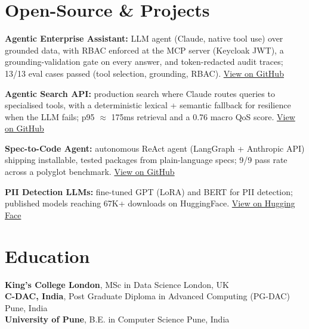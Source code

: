 \documentclass[10pt,a4paper]{article}
\begin{document}
\section{Open-Source \& Projects}
\begin{tight}
  \item \textbf{Agentic Enterprise Assistant:} LLM agent (Claude, native tool use) over grounded data, with RBAC enforced at the MCP server (Keycloak JWT), a grounding-validation gate on every answer, and token-redacted audit traces; 13/13 eval cases passed (tool selection, grounding, RBAC). \href{https://github.com/abhijeetscode/Agentic-Enterprise-Assistant}{View on GitHub}
  \item \textbf{Agentic Search API:} production search where Claude routes queries to specialised tools, with a deterministic lexical + semantic fallback for resilience when the LLM fails; p95 $\approx$ 175ms retrieval and a 0.76 macro QoS score. \href{https://github.com/abhijeetscode/search-agent}{View on GitHub}
  \item \textbf{Spec-to-Code Agent:} autonomous ReAct agent (LangGraph + Anthropic API) shipping installable, tested packages from plain-language specs; 9/9 pass rate across a polyglot benchmark. \href{https://github.com/abhijeetscode/Spec-to-Code-Agent}{View on GitHub}
  \item \textbf{PII Detection LLMs:} fine-tuned GPT (LoRA) and BERT for PII detection; published models reaching 67K+ downloads on HuggingFace. \href{https://huggingface.co/ab-ai/pii_model}{View on Hugging Face}
\end{tight}

\section{Education}
{\color{company}\bfseries King's College London}, MSc in Data Science \hfill {\color{muted}London, UK}\\
{\color{company}\bfseries C-DAC, India}, Post Graduate Diploma in Advanced Computing (PG-DAC) \hfill {\color{muted}Pune, India}\\
{\color{company}\bfseries University of Pune}, B.E. in Computer Science \hfill {\color{muted}Pune, India}
\end{document}
